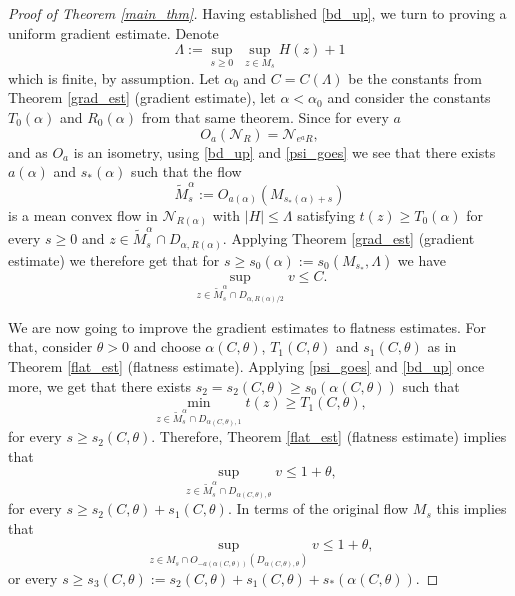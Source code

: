 \documentclass[leqno,11pt]{amsart}
\theoremstyle{definition}
\begin{document}
\begin{proof}[Proof of Theorem \ref{main_thm}]
{Having established \eqref{bd_up}, we turn to proving a uniform gradient estimate.} Denote 
\begin{equation}\label{Lambdadef}
\Lambda:=\sup_{s\geq 0}\;\sup_{z\in M_s}H(z)+{1 }
\end{equation}
which is finite, by assumption. {Let $\alpha_0$ and $C=C(\Lambda)$ be the constants from Theorem \ref{grad_est} (gradient estimate), let $\alpha<\alpha_0$ and consider the constants $T_0(\alpha)$ and $R_0(\alpha)$ from that same theorem. Since for every $a$
\begin{equation}
O_{a}\left(\mathcal{N}_R\right)=\mathcal{N}_{e^{a}R},
\end{equation}
{and as $O_a$ is an isometry}, using \eqref{bd_up} and \eqref{psi_goes} we see that there exists $a(\alpha)$ and $s_{\ast}(\alpha)$ such that the flow
\begin{equation}
\tilde{M}_s^{\alpha}:=O_{a(\alpha)}(M_{s_{\ast}(\alpha)+s})
\end{equation}
is a mean convex flow in $\mathcal{N}_{R(\alpha)}$ with $|H|\leq \Lambda$ satisfying $t(z)\geq T_0(\alpha)$ for every $s\geq 0$ and $z \in \tilde{M}_s^{\alpha}\cap D_{\alpha,R(\alpha)}$.  Applying Theorem { \ref{grad_est}} (gradient estimate) we therefore get that for $s\geq s_0(\alpha):=s_0(M_{s_{\ast}},\Lambda)$ we have
\begin{equation}
\sup_{z\in \tilde{M}_s^{\alpha}\cap D_{\alpha,R(\alpha)/{2}}} v\leq C. 
\end{equation} 
}

\bigskip

We are now going to improve the gradient estimates to flatness estimates. For that, consider $\theta>0$ and choose { $\alpha(C,\theta)$, $T_1(C,\theta)$ and $s_1(C,\theta)$}  as in Theorem \ref{flat_est} (flatness estimate). 
Applying \eqref{psi_goes} and \eqref{bd_up} once more, we get that there exists {$s_2=s_2(C,\theta)\geq s_0(\alpha(C,\theta))$} such that 
\begin{equation}
\min_{z\in \tilde{M}^{\alpha}_s\cap D_{\alpha({C},\theta),1}} t(z)\geq T_1({C},\theta),
\end{equation}
for every $s\geq s_2(C,\theta)$.  Therefore, Theorem \ref{flat_est} (flatness estimate) implies that
\begin{equation}\label{fin_grad_bd}
\sup_{z\in \tilde{M}^{\alpha}_s \cap D_{\alpha(C,\theta),\theta}} v \leq 1+\theta,
\end{equation}
for every $s\geq s_2(C,\theta)+s_1(C,\theta)$.  In terms of the original flow $M_s$ this implies that
\begin{equation}\label{fin_grad_bd_trans}
\sup_{z\in M_s \cap O_{-a(\alpha(C,\theta))}\left(D_{\alpha(C,\theta),\theta}\right)} v \leq 1+\theta,
\end{equation}
or every $s\geq s_3(C,\theta):=s_2(C,\theta)+s_1(C,\theta)+{s_{\ast}(\alpha(C,\theta))}$.



\end{proof}
\end{document}

